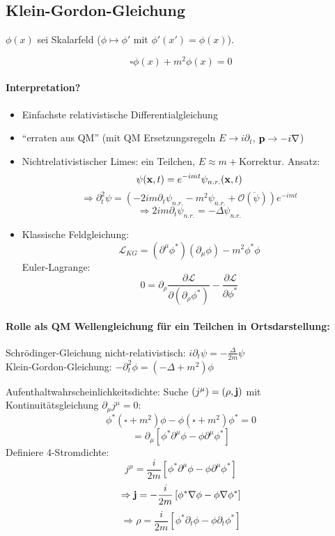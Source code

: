\documentclass[11pt,a4paper]{report}
\begin{document}
\subsection{Klein-Gordon-Gleichung}

$\phi (x)$ sei Skalarfeld ($\phi\mapsto \phi '$ mit $\phi '(x')=\phi (x)$).

$$\boxed{\square \phi (x) + m^2\phi (x) = 0}$$

\paragraph{Interpretation?}
\begin{itemize}
\item Einfachste relativistische Differentialgleichung
\item ``erraten aus QM'' (mit QM Ersetzungsregeln $E\rightarrow i\partial_t$, $\mathbf{p}\rightarrow -i\nabla$)
\item Nichtrelativistischer Limes: ein Teilchen, $E\approx m + \text{Korrektur}$. Ansatz:
$$\psi (\mathbf{x},t)=e^{-imt}\psi_{n.r.} (\mathbf{x},t)$$
$$\Rightarrow \partial_t^2\psi = (-2im\partial_t\psi_{n.r.}-m^2\psi_{n.r.}+\mathcal{O}(\ddot{\psi}))e^{-imt}$$
$$\Rightarrow 2im\partial_t\psi_{n.r.}=-\Delta\psi_{n.r.}$$
\item Klassische Feldgleichung:
$$\mathcal{L}_{KG}=(\partial^\mu \phi^*)(\partial_\mu\phi )-m^2\phi^*\phi$$
Euler-Lagrange:
$$0=\partial_\rho\frac{\partial\mathcal{L}}{\partial (\partial_\rho\phi^*)}-\frac{\partial\mathcal{L}}{\partial\phi^*}$$
\end{itemize}

\paragraph{Rolle als QM Wellengleichung für ein Teilchen in Ortsdarstellung:}
\mbox{}\par
Schrödinger-Gleichung nicht-relativistisch: $i\partial_t\psi = -\frac{\Delta}{2m}\psi$\\
Klein-Gordon-Gleichung: $-\partial_t^2\phi = (-\Delta +m^2)\phi$\par 

Aufenthaltwahrscheinlichkeitsdichte: Suche $(j^\mu )=(\rho ,\mathbf{j})$ mit Kontinuitätsgleichung $\partial_\mu j^\mu =0$:
$$\phi^* (\square + m^2)\phi -\phi (\square+m^2)\phi^* = 0$$
$$=\partial_\mu [\phi^*\partial^\mu \phi - \phi\partial^\mu\phi^*]$$
Definiere 4-Stromdichte:
$$j^\mu = \frac{i}{2m}\left[\phi^*\partial^\mu\phi -\phi\partial^\mu\phi^*\right]$$
$$\Rightarrow \mathbf{j}=-\frac{i}{2m}\left[\phi^*\nabla\phi -\phi\nabla\phi^*\right]$$
$$\Rightarrow \rho = \frac{i}{2m}\left[\phi^*\partial_t\phi - \phi\partial_t\phi^*\right]$$
\end{document}
